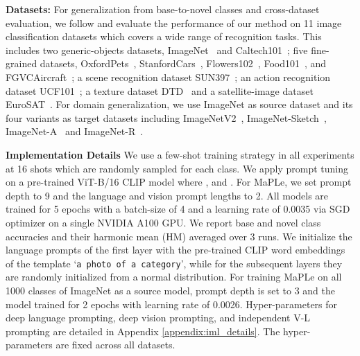 \documentclass[10pt,twocolumn,letterpaper]{article}
\newcommand{\txt}[1]{{\texttt{#1}}}
\begin{document}
\noindent \textbf{Datasets:}
For generalization from base-to-novel classes and cross-dataset evaluation, we follow \cite{zhou2022learning,zhou2022conditional} and evaluate the performance of our method on 11 image classification datasets which covers a wide range of recognition tasks. This includes two generic-objects datasets, ImageNet~\cite{deng2009imagenet} and Caltech101~\cite{fei2004learning}; five fine-grained datasets,  OxfordPets~\cite{parkhi2012cats}, StanfordCars~\cite{krause20133d}, Flowers102~\cite{nilsback2008automated}, Food101~\cite{bossard2014food}, and FGVCAircraft~\cite{maji2013fine}; a scene recognition dataset SUN397~\cite{xiao2010sun}; an action recognition dataset UCF101~\cite{soomro2012ucf101}; a texture dataset  DTD~\cite{cimpoi2014describing} and a satellite-image dataset EuroSAT~\cite{helber2019eurosat}. For domain generalization, we use ImageNet as source dataset and its four variants as target datasets including ImageNetV2~\cite{recht2019imagenet},  ImageNet-Sketch~\cite{wang2019learning}, ImageNet-A~\cite{hendrycks2021natural} and ImageNet-R~\cite{hendrycks2021many}. 

\noindent \textbf{Implementation Details} We use a few-shot training strategy in all experiments at 16 shots which are randomly sampled for each class. We apply prompt tuning on a pre-trained ViT-B/16 CLIP model where ,  and . For MaPLe, we set prompt depth  to 9 and the language and vision prompt lengths to 2. All models are trained for 5 epochs with a batch-size of 4 and a learning rate of 0.0035 via SGD optimizer on a single NVIDIA A100 GPU.
We report base and novel class accuracies and their harmonic mean (HM) averaged over 3 runs. We initialize the language prompts of the first layer  with the pre-trained CLIP word embeddings of the template `\txt{a photo of a category}', while for the subsequent layers they are randomly initialized from a normal distribution. For training MaPLe on all 1000 classes of ImageNet as a source model, prompt depth  is set to 3 and the model trained for 2 epochs with learning rate of 0.0026. Hyper-parameters for deep language prompting, deep vision prompting, and independent V-L prompting are detailed in Appendix \ref{appendix:iml_details}. The hyper-parameters are fixed across all datasets.
\end{document}

